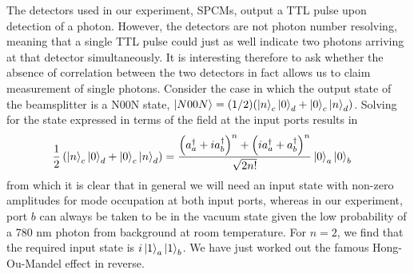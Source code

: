 The detectors used in our experiment, SPCMs, output a TTL pulse upon detection of a photon. However, the detectors are not photon number resolving, meaning that a single TTL pulse could just as well indicate two photons arriving at that detector simultaneously. It is interesting therefore to ask whether the absence of correlation between the two detectors in fact allows us to claim measurement of single photons. Consider the case in which the output state of the beamsplitter is a N00N state, $\ket{N00N} = (1/2)(\ket{n}_c\ket{0}_d + \ket{0}_c\ket{n}_d)$. Solving for the state expressed in terms of the field at the input ports results in
\begin{equation}
    \begin{aligned}
        \frac{1}{2}\left(\ket{n}_c\ket{0}_d+\ket{0}_c\ket{n}_d\right) &= \frac{\left(a_a^{\dagger} + i a_b^{\dagger}\right)^n + \left(i a_a^{\dagger} + a_b^{\dagger}\right)^n}{\sqrt{2 n!}}\ket{0}_a\ket{0}_b
    \end{aligned}
\end{equation}
from which it is clear that in general we will need an input state with non-zero amplitudes for mode occupation at both input ports, whereas in our experiment, port $b$ can always be taken to be in the vacuum state given the low probability of a 780 nm photon from background at room temperature.
For $n=2$, we find that the required input state is $i\ket{1}_a\ket{1}_b$. We have just worked out the famous Hong-Ou-Mandel effect\cite{Hong1987} in reverse.




